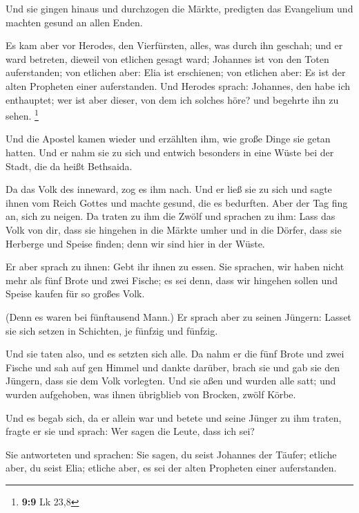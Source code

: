 Und sie gingen hinaus und durchzogen die Märkte,
predigten das Evangelium und machten gesund an allen Enden.

 Es kam aber vor Herodes, den Vierfürsten, alles, was
durch ihn geschah; und er ward betreten, dieweil von etlichen gesagt
ward; Johannes ist von den Toten auferstanden;  von
etlichen aber: Elia ist erschienen; von etlichen aber: Es ist der alten
Propheten einer auferstanden.  Und Herodes sprach:
Johannes, den habe ich enthauptet; wer ist aber dieser, von dem ich
solches höre? und begehrte ihn zu sehen. \footnote{\textbf{9:9} Lk 23,8}

 Und die Apostel kamen wieder und erzählten ihm, wie
große Dinge sie getan hatten. Und er nahm sie zu sich und entwich
besonders in eine Wüste bei der Stadt, die da heißt Bethsaida.

 Da das Volk des inneward, zog es ihm nach. Und er ließ
sie zu sich und sagte ihnen vom Reich Gottes und machte gesund, die es
bedurften. Aber der Tag fing an, sich zu neigen.  Da
traten zu ihm die Zwölf und sprachen zu ihm: Lass das Volk von dir, dass
sie hingehen in die Märkte umher und in die Dörfer, dass sie Herberge
und Speise finden; denn wir sind hier in der Wüste.

 Er aber sprach zu ihnen: Gebt ihr ihnen zu essen. Sie
sprachen, wir haben nicht mehr als fünf Brote und zwei Fische; es sei
denn, dass wir hingehen sollen und Speise kaufen für so großes Volk.

 (Denn es waren bei fünftausend Mann.) Er sprach aber zu
seinen Jüngern: Lasset sie sich setzen in Schichten, je fünfzig und
fünfzig.

 Und sie taten also, und es setzten sich alle.
 Da nahm er die fünf Brote und zwei Fische und sah auf
gen Himmel und dankte darüber, brach sie und gab sie den Jüngern, dass
sie dem Volk vorlegten.  Und sie aßen und wurden alle
satt; und wurden aufgehoben, was ihnen übrigblieb von Brocken, zwölf
Körbe.

 Und es begab sich, da er allein war und betete und seine
Jünger zu ihm traten, fragte er sie und sprach: Wer sagen die Leute,
dass ich sei?

 Sie antworteten und sprachen: Sie sagen, du seist
Johannes der Täufer; etliche aber, du seist Elia; etliche aber, es sei
der alten Propheten einer auferstanden.

